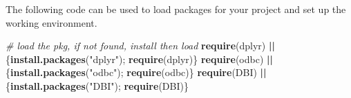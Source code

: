\documentclass[
]{book}
\newenvironment{Shaded}{\begin{snugshade}}{\end{snugshade}}
\newcommand{\CommentTok}[1]{\textcolor[rgb]{0.56,0.35,0.01}{\textit{#1}}}
\newcommand{\DecValTok}[1]{\textcolor[rgb]{0.00,0.00,0.81}{#1}}
\newcommand{\ErrorTok}[1]{\textcolor[rgb]{0.64,0.00,0.00}{\textbf{#1}}}
\newcommand{\FunctionTok}[1]{\textcolor[rgb]{0.13,0.29,0.53}{\textbf{#1}}}
\newcommand{\NormalTok}[1]{#1}
\newcommand{\OtherTok}[1]{\textcolor[rgb]{0.56,0.35,0.01}{#1}}
\newcommand{\SpecialCharTok}[1]{\textcolor[rgb]{0.81,0.36,0.00}{\textbf{#1}}}
\newcommand{\StringTok}[1]{\textcolor[rgb]{0.31,0.60,0.02}{#1}}
\theoremstyle{definition}
\theoremstyle{definition}
\theoremstyle{definition}
\theoremstyle{definition}
\theoremstyle{remark}
\begin{document}
\begin{Shaded}
\end{Shaded}

The following code can be used to load packages for your project and set up the working environment.

\begin{Shaded}
\begin{Highlighting}[]
\CommentTok{\# load the pkg, if not found, install then load}
\FunctionTok{require}\NormalTok{(dplyr) }\SpecialCharTok{||}\NormalTok{ \{}\FunctionTok{install.packages}\NormalTok{(}\StringTok{"dplyr"}\NormalTok{); }\FunctionTok{require}\NormalTok{(dplyr)\}}
\FunctionTok{require}\NormalTok{(odbc) }\SpecialCharTok{||}\NormalTok{ \{}\FunctionTok{install.packages}\NormalTok{(}\StringTok{"odbc"}\NormalTok{); }\FunctionTok{require}\NormalTok{(odbc)\}}
\FunctionTok{require}\NormalTok{(DBI) }\SpecialCharTok{||}\NormalTok{ \{}\FunctionTok{install.packages}\NormalTok{(}\StringTok{"DBI"}\NormalTok{); }\FunctionTok{require}\NormalTok{(DBI)\}}
\end{Highlighting}
\end{Shaded}
\end{document}
